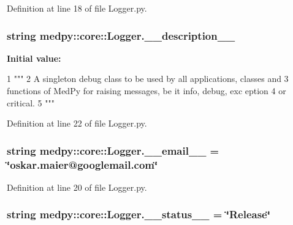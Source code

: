 Definition at line 18 of file Logger.py.

\hypertarget{namespacemedpy_1_1core_1_1Logger_af5f932a8ea01cd619edca16f8879f36f}{
\subsubsection[{\_\-\_\-description\_\-\_\-}]{\setlength{\rightskip}{0pt plus 5cm}string {\bf medpy::core::Logger.\_\-\_\-description\_\-\_\-}}}
\label{namespacemedpy_1_1core_1_1Logger_af5f932a8ea01cd619edca16f8879f36f}
{\bfseries Initial value:}
\begin{DoxyCode}
1 """
2                   A singleton debug class to be used by all applications, classes
       and 
3                   functions of MedPy for raising messages, be it info, debug, exc
      eption
4                   or critical.
5                   """
\end{DoxyCode}


Definition at line 22 of file Logger.py.

\hypertarget{namespacemedpy_1_1core_1_1Logger_a194b43b8cac541c0456d720696a67177}{
\subsubsection[{\_\-\_\-email\_\-\_\-}]{\setlength{\rightskip}{0pt plus 5cm}string {\bf medpy::core::Logger.\_\-\_\-email\_\-\_\-} = \char`\"{}oskar.maier@googlemail.com\char`\"{}}}
\label{namespacemedpy_1_1core_1_1Logger_a194b43b8cac541c0456d720696a67177}


Definition at line 20 of file Logger.py.

\hypertarget{namespacemedpy_1_1core_1_1Logger_adf582f13c47706399eb00023da58d95f}{
\subsubsection[{\_\-\_\-status\_\-\_\-}]{\setlength{\rightskip}{0pt plus 5cm}string {\bf medpy::core::Logger.\_\-\_\-status\_\-\_\-} = \char`\"{}Release\char`\"{}}}
\label{namespacemedpy_1_1core_1_1Logger_adf582f13c47706399eb00023da58d95f}


